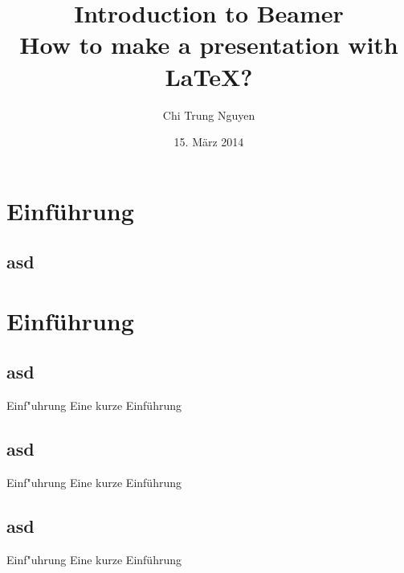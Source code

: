 \documentclass[xcolor=x11names,compress]{beamer} %
\title[Make a LaTeX presentation using Beamer]{Introduction  to Beamer\\How to make a presentation with LaTeX?}
\author{Chi Trung Nguyen}
\institute{HfTL}
\date{15. März 2014}
\renewcommand{\(}{\begin{columns}}
\renewcommand{\)}{\end{columns}}
\newcommand{\<}[1]{\begin{column}{#1}}
\renewcommand{\>}{\end{column}}
\begin{document}
\section{Einführung}	
\subsection{asd}
\begin{frame}
\titlepage
\end{frame}

\section{Einführung}
\subsection{asd}
\begin{frame}{Einf"uhrung}
Eine kurze Einführung
\end{frame}


\subsection{asd}
\begin{frame}{Einf"uhrung}
Eine kurze Einführung
\end{frame}


\subsection{asd}
\begin{frame}{Einf"uhrung}
Eine kurze Einführung
\end{frame}
\end{document}
